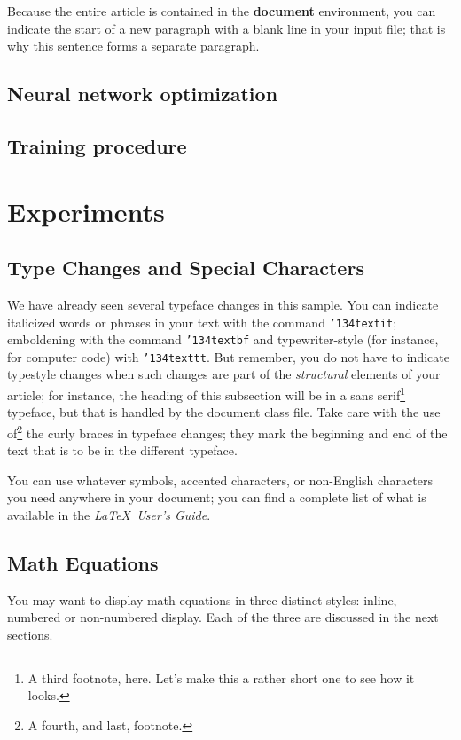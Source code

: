 \documentclass{sig-alternate-05-2015}
\begin{document}
Because the entire article is contained in
the \textbf{document} environment, you can indicate the
start of a new paragraph with a blank line in your
input file; that is why this sentence forms a separate paragraph.

\subsection{Neural network optimization}

\subsection{Training procedure}

\section{Experiments}

\subsection{Type Changes and {\subsecit Special} Characters}
We have already seen several typeface changes in this sample.  You
can indicate italicized words or phrases in your text with
the command \texttt{{\char'134}textit}; emboldening with the
command \texttt{{\char'134}textbf}
and typewriter-style (for instance, for computer code) with
\texttt{{\char'134}texttt}.  But remember, you do not
have to indicate typestyle changes when such changes are
part of the \textit{structural} elements of your
article; for instance, the heading of this subsection will
be in a sans serif\footnote{A third footnote, here.
Let's make this a rather short one to
see how it looks.} typeface, but that is handled by the
document class file. Take care with the use
of\footnote{A fourth, and last, footnote.}
the curly braces in typeface changes; they mark
the beginning and end of
the text that is to be in the different typeface.

You can use whatever symbols, accented characters, or
non-English characters you need anywhere in your document;
you can find a complete list of what is
available in the \textit{\LaTeX\
User's Guide}\cite{Lamport:LaTeX}.

\subsection{Math Equations}
You may want to display math equations in three distinct styles:
inline, numbered or non-numbered display.  Each of
the three are discussed in the next sections.
\end{document}

